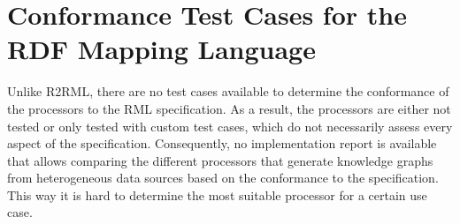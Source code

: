 \section{Conformance Test Cases for the RDF Mapping Language}


Unlike R2RML, there are no test cases available to determine the conformance of the processors to the RML specification. As a result, the processors are either not tested or only tested with custom test cases, which do not necessarily assess every aspect of the specification. Consequently, no implementation report is available that allows comparing the different processors that generate knowledge graphs from heterogeneous data sources
based on the conformance to the specification. This way it is hard to determine the most suitable processor for a certain use case.

